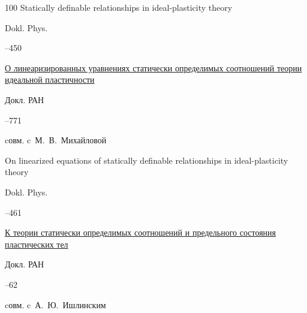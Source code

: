 \begin{thebibliography}{100}
\paper Statically definable relationships in ideal-plasticity theory

\jour Dokl. Phys. 



--450








\paper \href{http://elibrary.ru/item.asp?id=17339469}{О линеаризированных уравнениях статически определимых соотношений теории идеальной пластичности}

\jour Докл. РАН




–771

\miscnote cовм. c~М.~В.~Михайловой



\transl

\paper On linearized equations of statically definable relationships in ideal-plasticity theory

\jour Dokl. Phys.



--461






\paper \href{http://elibrary.ru/item.asp?id=17339722}{К теории статически определимых соотношений и предельного состояния пластических тел}

\jour Докл. РАН




--62

\miscnote cовм. c~А.~Ю.~Ишлинским




\end{thebibliography}
